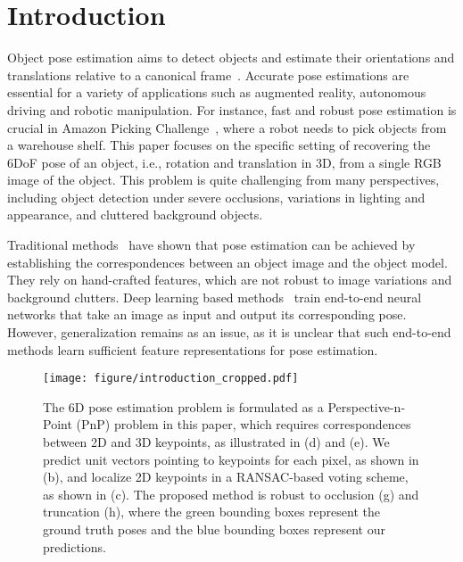 \documentclass[10pt,twocolumn,letterpaper]{article}
\begin{document}
 \section{Introduction}



Object pose estimation aims to detect objects and estimate their orientations and translations relative to a canonical frame~\cite{xiang2014beyond}. Accurate pose estimations are essential for a variety of applications such as augmented reality, autonomous driving and robotic manipulation. For instance, fast and robust pose estimation is crucial in Amazon Picking Challenge~\cite{correll2018analysis}, where a robot needs to pick objects from a warehouse shelf. This paper focuses on the specific setting of recovering the 6DoF pose of an object, i.e., rotation and translation in 3D, from a single RGB image of the object. This problem is quite challenging from many perspectives, including object detection under severe occlusions, variations in lighting and appearance, and cluttered background objects.



Traditional methods~\cite{lowe1999object,lepetit2005monocular,hinterstoisser2012model} have shown that pose estimation can be achieved by establishing the correspondences between an object image and the object model. They rely on hand-crafted features, which are not robust to image variations and background clutters. Deep learning based methods~\cite{su2015render, kehl2017ssd, xiang2017posecnn, bui2018regression} train end-to-end neural networks that take an image as input and output its corresponding pose. However, generalization remains as an issue, as it is unclear that such end-to-end methods learn sufficient feature representations for pose estimation.  



\begin{figure}
    \centering
    \texttt{[image: figure/introduction\_cropped.pdf]}
    \caption{The 6D pose estimation problem is formulated as a Perspective-n-Point (PnP) problem in this paper, which requires correspondences between 2D and 3D keypoints, as illustrated in (d) and (e). We predict unit vectors pointing to keypoints for each pixel, as shown in (b), and localize 2D keypoints in a RANSAC-based voting scheme, as shown in (c). The proposed method is robust to occlusion (g) and truncation (h), where the green bounding boxes represent the ground truth poses and the blue bounding boxes represent our predictions.}
    \label{fig:introduction}
    \vspace{-4mm}
\end{figure}
\end{document}
